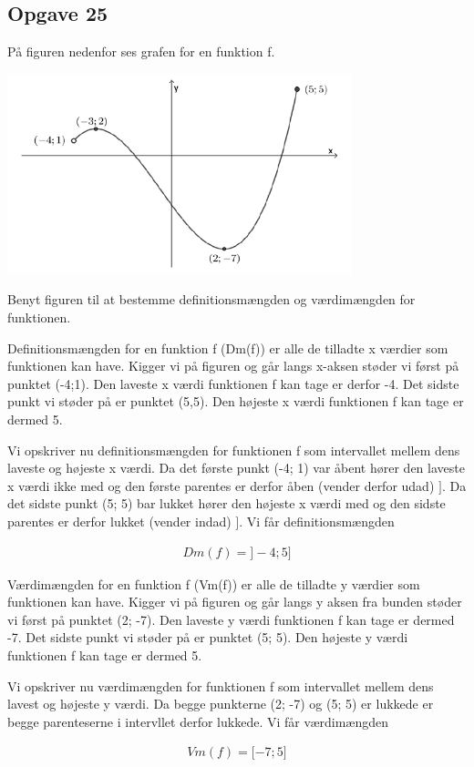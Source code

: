 \subsection{Opgave 25}

På figuren nedenfor ses grafen for en funktion f.

\includegraphics[width=10cm]{Opgave_21-30/Opgave_25/25.png}

Benyt figuren til at bestemme definitionsmængden og værdimængden for funktionen.

\ans

Definitionsmængden for en funktion f (Dm(f)) er alle de tilladte x værdier som funktionen kan have.
Kigger vi på figuren og går langs x-aksen støder vi først på punktet (-4;1). Den laveste x værdi funktionen f kan tage er derfor -4.
Det sidste punkt vi støder på er punktet (5,5). Den højeste x værdi funktionen f kan tage er dermed 5.


Vi opskriver nu definitionsmængden for funktionen f som intervallet mellem dens laveste og højeste x værdi.
Da det første punkt (-4; 1) var åbent hører den laveste x værdi ikke med og den første parentes er derfor åben (vender derfor udad) $\rbrack$.
Da det sidste punkt (5; 5) bar lukket hører den højeste x værdi med og den sidste parentes er derfor lukket (vender indad) $\rbrack$.
Vi får definitionsmængden

\begin{align*}
    Dm(f) = \rbrack-4; 5\rbrack
\end{align*}

Værdimængden for en funktion f (Vm(f)) er alle de tilladte y værdier som funktionen kan have.
Kigger vi på figuren og går langs y aksen fra bunden støder vi først på punktet (2; -7). Den laveste y værdi funktionen f kan tage er dermed -7.
Det sidste punkt vi støder på er punktet (5; 5). Den højeste y værdi funktionen f kan tage er dermed 5.

Vi opskriver nu værdimængden for funktionen f som intervallet mellem dens lavest og højeste y værdi.
Da begge punkterne (2; -7) og (5; 5) er lukkede er begge parenteserne i intervllet derfor lukkede.
Vi får værdimængden

\begin{align*}
    Vm(f) = \lbrack -7; 5 \rbrack
\end{align*}